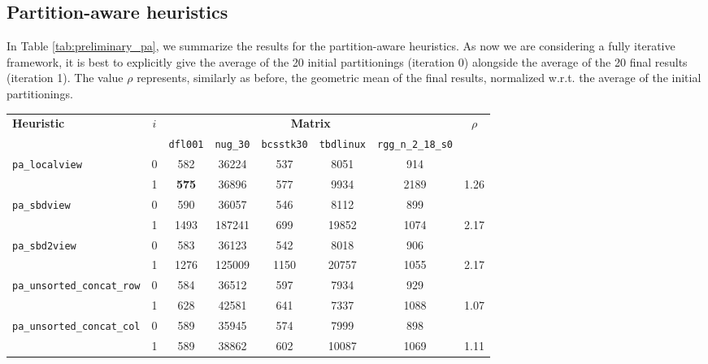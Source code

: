 \subsection{Partition-aware heuristics} \label{sec:preliminary_pa}

In Table \ref{tab:preliminary_pa}, we summarize the results for the partition-aware heuristics. As now we are considering a fully iterative framework, it is best to explicitly give the average of the 20 initial partitionings (iteration 0) alongside the average of the 20 final results (iteration 1). The value $\rho$ represents, similarly as before, the geometric mean of the final results, normalized w.r.t. the average of the initial partitionings. 

\begin{table}[h]
	\centering
	\renewcommand{\arraystretch}{1.15}
	\begin{tabular}{|l|c||c|c|c|c|c||c|}
		\hline
		\multirow{2}{*}{\textbf{Heuristic}} & \multirow{2}{*}{$i$} &  \multicolumn{5}{|c||}{\textbf{Matrix}} & \multirow{2}{*}{$\rho$} \\ \cline{3-7}
		& & \texttt{dfl001} & \texttt{nug\_30} & \texttt{bcsstk30} & \texttt{tbdlinux} & \texttt{rgg\_n\_2\_18\_s0} & \\ \hline
		\verb|pa_localview| & 0 & 582 & 36224 & 537 & 8051 & 914 &   \\ %
		& 1 & \textbf{575} & 36896 & 577 & 9934 & 2189 & 1.26 \\ \hline %

		\verb|pa_sbdview| & 0 & 590 & 36057 & 546 & 8112 & 899 & \\ %
		& 1 & 1493 & 187241 & 699 & 19852 & 1074 & 2.17 \\ \hline %

		\verb|pa_sbd2view| & 0 & 583 &  36123 & 542 & 8018 & 906 &  \\ %
		& 1 & 1276 & 125009 & 1150 & 20757 & 1055 & 2.17 \\ \hline %
		
		\verb|pa_unsorted_concat_row| & 0 & 584 & 36512 & 597 & 7934 & 929 & \\ %
		& 1 & 628 & 42581 & 641 & 7337 & 1088 & 1.07 \\\hline %
		
		\verb|pa_unsorted_concat_col| & 0 & 589 & 35945 & 574 & 7999 & 898 & \\ %
		& 1 & 589 & 38862 & 602 & 10087 & 1069 & 1.11 \\\hline %
		

\end{tabular}
\end{table}
